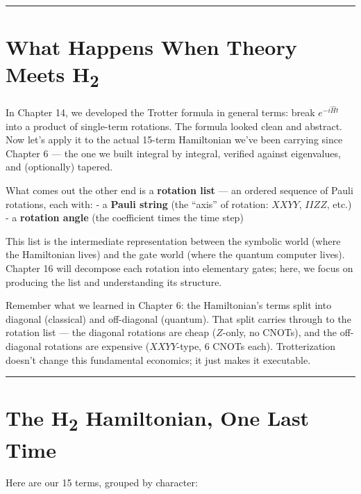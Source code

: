 \documentclass[
  11pt,
  oneside]{book}
\begin{document}
\begin{center}\rule{0.5\linewidth}{0.5pt}\end{center}

\section{What Happens When Theory Meets
H\textsubscript{2}}\label{what-happens-when-theory-meets-hux2082}

In Chapter 14, we developed the Trotter formula in general terms: break
\(e^{-i\hat{H}t}\) into a product of single-term rotations. The formula
looked clean and abstract. Now let's apply it to the actual 15-term
Hamiltonian we've been carrying since Chapter 6 --- the one we built
integral by integral, verified against eigenvalues, and (optionally)
tapered.

What comes out the other end is a \textbf{rotation list} --- an ordered
sequence of Pauli rotations, each with: - a \textbf{Pauli string} (the
``axis'' of rotation: \(XXYY\), \(IIZZ\), etc.) - a \textbf{rotation
angle} (the coefficient times the time step)

This list is the intermediate representation between the symbolic world
(where the Hamiltonian lives) and the gate world (where the quantum
computer lives). Chapter 16 will decompose each rotation into elementary
gates; here, we focus on producing the list and understanding its
structure.

Remember what we learned in Chapter 6: the Hamiltonian's terms split
into diagonal (classical) and off-diagonal (quantum). That split carries
through to the rotation list --- the diagonal rotations are cheap
(\(Z\)-only, no CNOTs), and the off-diagonal rotations are expensive
(\(XXYY\)-type, 6 CNOTs each). Trotterization doesn't change this
fundamental economics; it just makes it executable.

\begin{center}\rule{0.5\linewidth}{0.5pt}\end{center}

\section{The H\textsubscript{2} Hamiltonian, One Last
Time}\label{the-hux2082-hamiltonian-one-last-time}

Here are our 15 terms, grouped by character:
\end{document}
